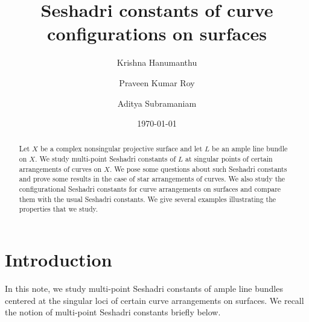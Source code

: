 \documentclass[12pt,reqno]{amsart}
\theoremstyle{plain}
\numberwithin{equation}{section}
\theoremstyle{definition}
\begin{document}
	\title[Seshadri constants  of curve configurations on surfaces]{Seshadri constants  of curve configurations on surfaces}
	\author[K. Hanumanthu]{Krishna Hanumanthu}

\address{Chennai Mathematical Institute, H1 SIPCOT IT Park, Siruseri, Kelambakkam 603103,
India.}


\author[P. K. Roy]{Praveen Kumar Roy}

\address{UM-DAE Centre for Excellence in Basic Sciences
"Nalanda", Opp Nano Sciences Building,
University of Mumbai, Vidyanagari,
Mumbai 400098, India.}


\author[A. Subramaniam]{Aditya Subramaniam}

\address{Indian Institute of Science Education and Research Tirupati, Rami Reddy Nagar, Karakambadi Road, Mangalam (P.O.)
Tirupati, Andhra Pradesh, INDIA – 517507.}



\date{\today}

	\begin{abstract}
	Let $X$ be a complex nonsingular projective surface and let $L$ be an ample line bundle on $X$. We study multi-point Seshadri constants of $L$ at singular points of certain arrangements of curves on $X$. We pose some questions about such Seshadri constants and prove some results in the case of star arrangements of curves. We also study the configurational Seshadri constants for curve arrangements on surfaces and compare them with the usual Seshadri constants. We give several examples illustrating the properties that we study. 
	\end{abstract}
	
		\maketitle

	
	\section{Introduction}
	In this note, we study multi-point Seshadri constants of ample line bundles centered at the singular loci of certain curve arrangements on surfaces. We recall the notion of  multi-point Seshadri constants briefly below. 
	
\end{document}
